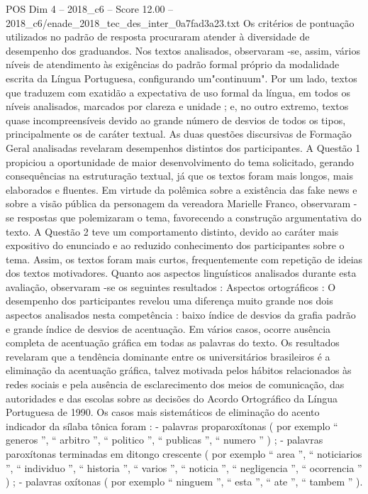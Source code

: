 \begin{textsample}{POS Dim 4 – 2018\_c6 – Score 12.00 – 2018\_c6/enade\_2018\_tec\_des\_inter\_0a7fad3a23.txt}
Os critérios de pontuação utilizados no padrão de resposta procuraram atender à diversidade de desempenho dos graduandos.
Nos textos analisados, observaram -se, assim, vários níveis de atendimento às exigências do padrão formal próprio da modalidade escrita da Língua Portuguesa, configurando um"continuum".
Por um lado, textos que traduzem com exatidão a expectativa de uso formal da língua, em todos os níveis analisados, marcados por clareza e unidade ; e, no outro extremo, textos quase incompreensíveis devido ao grande número de desvios de todos os tipos, principalmente os de caráter textual.
As duas questões discursivas de Formação Geral analisadas revelaram desempenhos distintos dos participantes.
A Questão 1 propiciou a oportunidade de maior desenvolvimento do tema solicitado, gerando consequências na estruturação textual, já que os textos foram mais longos, mais elaborados e fluentes.
Em virtude da polêmica sobre a existência das fake news e sobre a visão pública da personagem da vereadora Marielle Franco, observaram -se respostas que polemizaram o tema, favorecendo a construção argumentativa do texto.
A Questão 2 teve um comportamento distinto, devido ao caráter mais expositivo do enunciado e ao reduzido conhecimento dos participantes sobre o tema.
Assim, os textos foram mais curtos, frequentemente com repetição de ideias dos textos motivadores.
Quanto aos aspectos linguísticos analisados durante esta avaliação, observaram -se os seguintes resultados : Aspectos ortográficos : O desempenho dos participantes revelou uma diferença muito grande nos dois aspectos analisados nesta competência : baixo índice de desvios da grafia padrão e grande índice de desvios de acentuação.
Em vários casos, ocorre ausência completa de acentuação gráfica em todas as palavras do texto.
Os resultados revelaram que a tendência dominante entre os universitários brasileiros é a eliminação da acentuação gráfica, talvez motivada pelos hábitos relacionados às redes sociais e pela ausência de esclarecimento dos meios de comunicação, das autoridades e das escolas sobre as decisões do Acordo Ortográfico da Língua Portuguesa de 1990.
Os casos mais sistemáticos de eliminação do acento indicador da sílaba tônica foram : - palavras proparoxítonas ( por exemplo “ generos ”, “ arbitro ”, “ politico ”, “ publicas ”, “ numero ” ) ; - palavras paroxítonas terminadas em ditongo crescente ( por exemplo “ area ”, “ noticiarios ”, “ individuo ”, “ historia ”, “ varios ”, “ noticia ”, “ negligencia ”, “ ocorrencia ” ) ; - palavras oxítonas ( por exemplo “ ninguem ”, “ esta ”, “ ate ”, “ tambem ” ).

\end{textsample}
